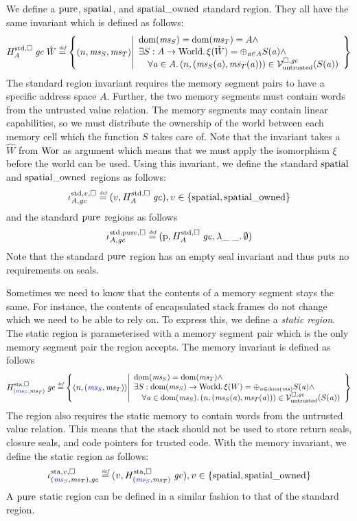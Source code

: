 \begin{jversion}
We define a $\pure$, $\spatial$, and $\spatialo$ standard region. They all have the same invariant which is defined as follows:
\[
  H_A^{\mathrm{std},\square} \; \gc \; \hat{W} \defeq \left\{ \npair{\ms_S,\ms_T} \middle|
    \begin{array}{l}
      \dom(\ms_S) = \dom(\ms_T) = A \wedge \\
      \exists S : A \fun \World \ldotp \xi(\hat{W}) = \oplus_{\aaddr \in A} S(\aaddr) \wedge\\ 
      \quad \forall \aaddr \in A \ldotp \npair{(\ms_S(\aaddr),\ms_T(\aaddr))} \in \lrv(S(\aaddr))
    \end{array}
  \right\}
\]
The standard region invariant requires the memory segment pairs to have a specific address space $A$.
Further, the two memory segments must contain words from the untrusted value relation.
The memory segments may contain linear capabilities, so we must distribute the ownership of the world between each memory cell which the function $S$ takes care of.
Note that the invariant takes a $\hat{W}$ from $\Wor$ as argument which means that we must apply the isomorphism $\xi$ before the world can be used.
Using this invariant, we define the standard $\spatial$ and $\spatialo$ regions as follows:
\[
  \stdreg{A,\gc}{v} \defeq (v,H_A^{\mathrm{std},\square} \; \gc) , v \in \{\spatial,\spatialo\}
\]
and the standard $\pure$ regions as follows
\[
  \stdreg{A,\gc}{\pure} \defeq (\pur,H_A^{\mathrm{std},\square} \; \gc, \lambda \_ \; \_ \ldotp \emptyset)
\]
Note that the standard $\pure$ region has an empty seal invariant and thus puts no requirements on seals.

Sometimes we need to know that the contents of a memory segment stays the same.
For instance, the contents of encapsulated stack frames do not change which we need to be able to rely on.
To express this, we define a \emph{static region}.
The static region is parameterised with a memory segment pair which is the only memory segment pair the region accepts.
The memory invariant is defined as follows
\[
  H^\mathrm{sta,\square}_{\stpair{\ms}{\ms}} \; \gc \defeq \left\{ \npair{\stpair{\ms}{\ms}} \middle| 
    \begin{array}{l}
      \dom(\ms_S) = \dom(\ms_T) \wedge \\
      \exists S : \dom(\ms_S) \fun \World \ldotp \xi(W) = \oplus_{\aaddr \in \dom(\ms)} S(\aaddr) \wedge\\
      \quad \forall \aaddr \in \dom(\ms_S) \ldotp \npair{(\ms_S(\aaddr),\ms_T(\aaddr))} \in \lrv(S(\aaddr))
    \end{array}
\right\}
\]
The region also requires the static memory to contain words from the untrusted value relation.
This means that the stack should not be used to store return seals, closure seals, and code pointers for trusted code.
With the memory invariant, we define the static region as follows:
\[
  \stareg[\stpair{\ms}{\ms},\gc]{v,\square} \defeq (v,H^\mathrm{sta,\square}_{\stpair{\ms}{\ms}} \; \gc) , v \in \{\spatial,\spatialo\}
\]
A $\pure$ static region can be defined in a similar fashion to that of the standard region.


\end{jversion}
